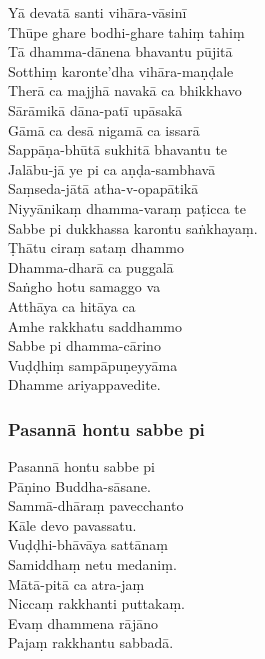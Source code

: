 
\enlargethispage{\baselineskip}

Yā devatā santi vihāra-vāsinī\\
Thūpe ghare bodhi-ghare tahiṃ tahiṃ\\
Tā dhamma-dānena bhavantu pūjitā\\
Sotthiṃ karonte'dha vihāra-maṇḍale\\
Therā ca majjhā navakā ca bhikkhavo\\
Sārāmikā dāna-patī upāsakā\\
Gāmā ca desā nigamā ca issarā\\
Sappāṇa-bhūtā sukhitā bhavantu te\\
Jalābu-jā ye pi ca aṇḍa-sambhavā\\
Saṃseda-jātā atha-v-opapātikā\\
Niyyānikaṃ dhamma-varaṃ paṭicca te\\
Sabbe pi dukkhassa karontu saṅkhayaṃ.\\
Ṭhātu ciraṃ sataṃ dhammo\\
Dhamma-dharā ca puggalā\\
Saṅgho hotu samaggo va\\
Atthāya ca hitāya ca\\
Amhe rakkhatu saddhammo\\
Sabbe pi dhamma-cārino\\
Vuḍḍhiṃ sampāpuṇeyyāma\\
Dhamme ariyappavedite.

\subsubsection{Pasannā hontu sabbe pi}



Pasannā hontu sabbe pi\\
Pāṇino Buddha-sāsane.\\
Sammā-dhāraṃ pavecchanto\\
Kāle devo pavassatu.\\
Vuḍḍhi-bhāvāya sattānaṃ\\
Samiddhaṃ netu medaniṃ.\\
Mātā-pitā ca atra-jaṃ\\
Niccaṃ rakkhanti puttakaṃ.\\
Evaṃ dhammena rājāno\\
Pajaṃ rakkhantu sabbadā.

